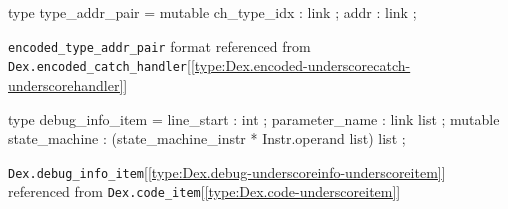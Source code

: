 \documentclass[11pt]{article}
\begin{document}
\label{type:Dex.type-underscoreaddr-underscorepair}\begin{ocamldoccode}
type type_addr_pair = {}
  mutable ch_type_idx : link ;
  addr : link ;
{}
\end{ocamldoccode}
\begin{ocamldocdescription}
{\tt{encoded\_type\_addr\_pair}} format referenced from {\tt{Dex.encoded\_catch\_handler}}[\ref{type:Dex.encoded-underscorecatch-underscorehandler}]


\end{ocamldocdescription}




\label{type:Dex.debug-underscoreinfo-underscoreitem}\begin{ocamldoccode}
type debug_info_item = {}
  line_start : int ;
  parameter_name : link list ;
  mutable state_machine : (state_machine_instr * Instr.operand list) list ;
{}
\end{ocamldoccode}
\begin{ocamldocdescription}
{\tt{Dex.debug\_info\_item}}[\ref{type:Dex.debug-underscoreinfo-underscoreitem}] referenced from {\tt{Dex.code\_item}}[\ref{type:Dex.code-underscoreitem}]


\end{ocamldocdescription}
\end{document}
